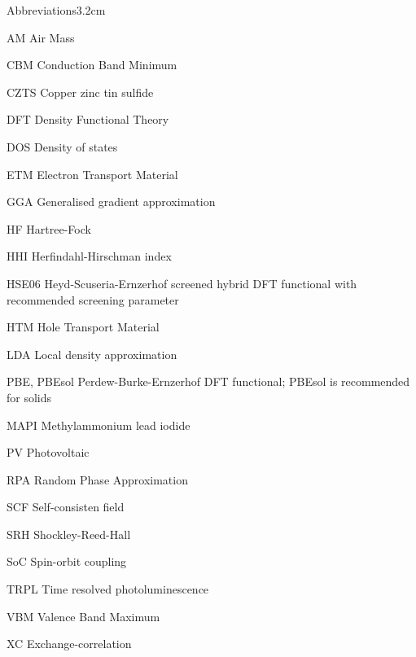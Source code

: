 \begin{mclistof}{Abbreviations}{3.2cm}

\item[AM] Air Mass
\item[CBM] Conduction Band Minimum
\item[CZTS] Copper zinc tin sulfide
\item[DFT] Density Functional Theory
\item[DOS] Density of states
\item[ETM] Electron Transport Material
\item[GGA] Generalised gradient approximation
\item[HF] Hartree-Fock
\item[HHI] Herfindahl-Hirschman index
\item[HSE06] Heyd-Scuseria-Ernzerhof screened hybrid DFT functional with recommended screening parameter
\item[HTM] Hole Transport Material
\item[LDA] Local density approximation
\item[PBE, PBEsol] Perdew-Burke-Ernzerhof DFT functional; PBEsol is recommended for solids
\item[MAPI] Methylammonium lead iodide
\item[PV] Photovoltaic
\item[RPA] Random Phase Approximation
\item[SCF] Self-consisten field
\item[SRH] Shockley-Reed-Hall 
\item[SoC] Spin-orbit coupling
\item[TRPL] Time resolved photoluminescence
\item[VBM] Valence Band Maximum
\item[XC] Exchange-correlation

\end{mclistof} 
